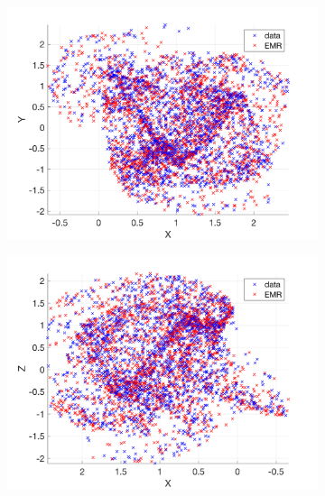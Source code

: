 \documentclass[12pt]{article}
\begin{document}
\begin{figure}[H]
	\centering
	\begin{subfigure}[b]{0.3\textwidth}
		\centering
		\includegraphics[width=\textwidth]{plots/l84l63/traj1l840025.png}
	\end{subfigure}
	\hfill
	\begin{subfigure}[b]{0.3\textwidth}
		\centering
		\includegraphics[width=\textwidth]{plots/l84l63/traj2l840025.png}
	\end{subfigure}
	\hfill
	\begin{subfigure}[b]{0.3\textwidth}
		\centering

\end{subfigure}
\end{figure}
\end{document}
